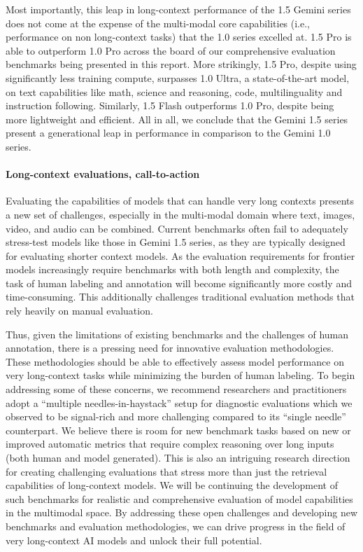 Most importantly, this leap in long-context performance of the 1.5 Gemini series does not come at the expense of the multi-modal core capabilities (i.e., performance on non long-context tasks) that the 1.0 series excelled at. 1.5 Pro is able to outperform 1.0 Pro across the board of our comprehensive evaluation benchmarks being presented in this report. More strikingly, 1.5 Pro, despite using significantly less training compute, surpasses 1.0 Ultra, a state-of-the-art model, on  text capabilities like math, science and reasoning, code, multilinguality and instruction following. Similarly, 1.5 Flash outperforms 1.0 Pro, despite being more lightweight and efficient. All in all, we conclude that the Gemini 1.5 series present a generational leap in performance in comparison to the Gemini 1.0 series.

\paragraph*{Long-context evaluations, call-to-action} Evaluating the capabilities of models that can handle very long contexts presents a new set of challenges, especially in the multi-modal domain where text, images, video, and audio can be combined. Current benchmarks often fail to adequately stress-test models like those in Gemini 1.5 series, as they are typically designed for evaluating shorter context models. As the evaluation requirements for frontier models increasingly require benchmarks with both length and complexity, the task of human labeling and annotation will become significantly more costly and time-consuming. This additionally challenges traditional evaluation methods that rely heavily on manual evaluation. 

Thus, given the limitations of existing benchmarks and the challenges of human annotation, there is a pressing need for innovative evaluation methodologies. These methodologies should be able to effectively assess model performance on very long-context tasks while minimizing the burden of human labeling. To begin addressing some of these concerns, we recommend researchers and practitioners adopt a ``multiple needles-in-haystack'' setup for diagnostic evaluations which we observed to be signal-rich and more challenging compared to its ``single needle'' counterpart. We believe there is room for new benchmark tasks based on new or improved automatic metrics that require complex reasoning over long inputs (both human and model generated). This is also an intriguing research direction for creating challenging evaluations that stress more than just the retrieval capabilities of long-context models. We will be continuing the development of such benchmarks for realistic and comprehensive evaluation of model capabilities in the multimodal space. By addressing these open challenges and developing new benchmarks and evaluation methodologies, we can drive progress in the field of very long-context AI models and unlock their full potential.


